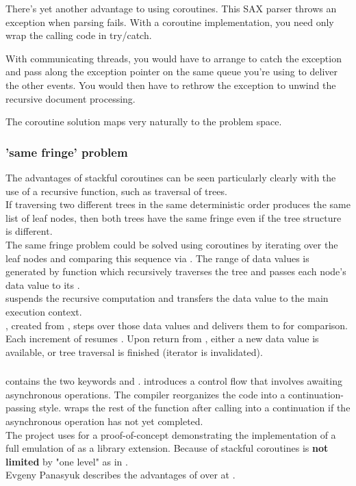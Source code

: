 There's yet another advantage to using coroutines. This SAX parser throws an
exception when parsing fails. With a coroutine implementation, you need only
wrap the calling code in try/catch.

With communicating threads, you would have to arrange to catch the exception
and pass along the exception pointer on the same queue you're using to deliver
the other events. You would then have to rethrow the exception to unwind the
recursive document processing.

The coroutine solution maps very naturally to the problem space.

\subsubsection*{'same fringe' problem}
The advantages of stackful coroutines can be seen particularly clearly with
the use of a recursive function, such as traversal of trees.\\
If traversing two different trees in the same deterministic order produces the
same list of leaf nodes, then both trees have the same fringe even if the tree
structure is different.\\
\newline
The same fringe problem could be solved using coroutines by iterating over the
leaf nodes and comparing this sequence via . The range of data
values is generated by function  which recursively traverses the
tree and passes each node's data value to its \pushcoro.\\
\pushcoro suspends the recursive computation and transfers the data value to
the main execution context.\\
\pullcoroiterator, created from \pullcoro, steps over those data values and
delivers them to  for comparison. Each increment of \pullcoroiterator
resumes . Upon return from , either
a new data value is available, or tree traversal is finished (iterator is
invalidated).

\subsubsection*{\csharp \await}
\csharp contains the two keywords \async and \await. \async introduces a
control flow that involves awaiting asynchronous operations. The compiler
reorganizes the code into a continuation-passing style. \await wraps the rest
of the function after calling \await into a continuation if the asynchronous
operation has not yet completed.\\
The project \awaitemu uses \boostcoroutine for a proof-of-concept
demonstrating the implementation of a full emulation of \csharp \await as a
library extension. Because of stackful coroutines \await is \textbf{not limited}
by "one level" as in \csharp.\\
Evgeny Panasyuk describes the advantages of \boostcoroutine over \await at
\channelnine.
